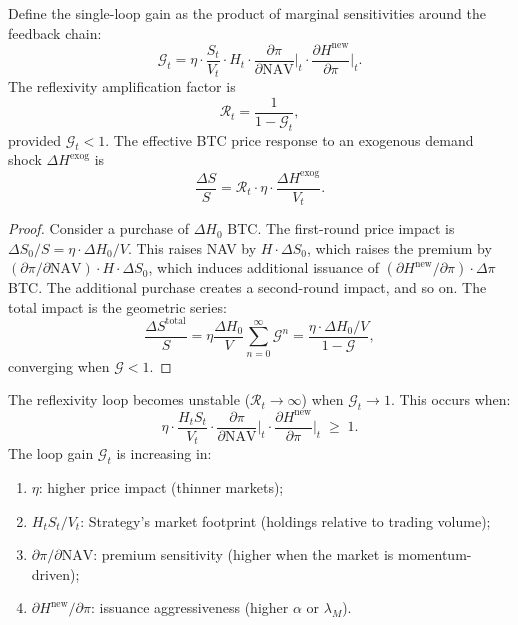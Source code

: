 \begin{theorem}\label{thm:reflexivity}
Define the single-loop gain as the product of marginal sensitivities
around the feedback chain:
\begin{equation}\label{eq:loop_gain}
  \mathcal{G}_t
  = \eta \cdot \frac{S_t}{V_t}
    \cdot H_t
    \cdot \frac{\partial \pi}{\partial \mathrm{NAV}}\bigg|_t
    \cdot \frac{\partial H^{\mathrm{new}}}{\partial \pi}\bigg|_t.
\end{equation}
The reflexivity amplification factor is
\begin{equation}\label{eq:amplification}
  \mathcal{R}_t = \frac{1}{1 - \mathcal{G}_t},
\end{equation}
provided $\mathcal{G}_t < 1$.  The effective BTC price response to an
exogenous demand shock $\Delta H^{\mathrm{exog}}$ is
\begin{equation}\label{eq:amplified_impact}
  \frac{\Delta S}{S}
  = \mathcal{R}_t \cdot \eta \cdot \frac{\Delta H^{\mathrm{exog}}}{V_t}.
\end{equation}
\end{theorem}

\begin{proof}
Consider a purchase of $\Delta H_0$ BTC.  The first-round price impact is
$\Delta S_0 / S = \eta \cdot \Delta H_0 / V$.  This raises NAV by
$H \cdot \Delta S_0$, which raises the premium by
$(\partial\pi/\partial\mathrm{NAV}) \cdot H \cdot \Delta S_0$, which
induces additional issuance of
$(\partial H^{\mathrm{new}}/\partial\pi) \cdot \Delta\pi$ BTC.  The
additional purchase creates a second-round impact, and so on.  The total
impact is the geometric series:
\[
  \frac{\Delta S^{\mathrm{total}}}{S}
  = \eta \frac{\Delta H_0}{V}
    \sum_{n=0}^{\infty} \mathcal{G}^n
  = \frac{\eta \cdot \Delta H_0 / V}{1 - \mathcal{G}},
\]
converging when $\mathcal{G} < 1$.
\end{proof}

\begin{proposition}\label{prop:instability}
The reflexivity loop becomes unstable ($\mathcal{R}_t \to \infty$) when
$\mathcal{G}_t \to 1$.  This occurs when:
\begin{equation}\label{eq:instability}
  \eta \cdot \frac{H_t S_t}{V_t}
  \cdot \frac{\partial \pi}{\partial \mathrm{NAV}}\bigg|_t
  \cdot \frac{\partial H^{\mathrm{new}}}{\partial \pi}\bigg|_t
  \;\ge\; 1.
\end{equation}
The loop gain $\mathcal{G}_t$ is increasing in:
\begin{enumerate}
  \item $\eta$: higher price impact (thinner markets);
  \item $H_t S_t / V_t$: Strategy's market footprint (holdings relative
    to trading volume);
  \item $\partial\pi / \partial\mathrm{NAV}$: premium sensitivity
    (higher when the market is momentum-driven);
  \item $\partial H^{\mathrm{new}} / \partial\pi$: issuance aggressiveness
    (higher $\alpha$ or $\lambda_M$).
\end{enumerate}
\end{proposition}

